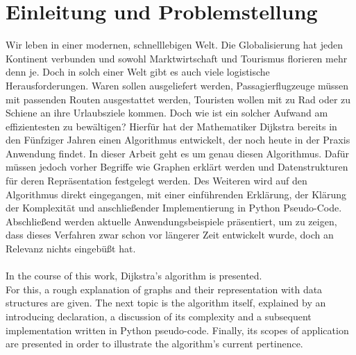 \chapter{Einleitung und Problemstellung}

Wir leben in einer modernen, schnelllebigen Welt. Die Globalisierung hat jeden Kontinent verbunden und sowohl Marktwirtschaft und Tourismus florieren mehr denn je.
Doch in solch einer Welt gibt es auch viele logistische Herausforderungen. Waren sollen ausgeliefert werden, Passagierflugzeuge müssen mit passenden Routen ausgestattet werden, Touristen wollen mit zu Rad oder zu Schiene an ihre Urlaubsziele kommen.
Doch wie ist ein solcher Aufwand am effizientesten zu bewältigen?
Hierfür hat der Mathematiker Dijkstra bereits in den Fünfziger Jahren einen Algorithmus entwickelt, der noch heute in der Praxis Anwendung findet.
In dieser Arbeit geht es um genau diesen Algorithmus.
Dafür müssen jedoch vorher Begriffe wie \glqq Graphen \grqq erklärt werden und Datenstrukturen für deren Repräsentation festgelegt werden.
Des Weiteren wird auf den Algorithmus direkt eingegangen, mit einer einführenden Erklärung, der Klärung der Komplexität und anschließender Implementierung in Python Pseudo-Code.
Abschließend werden aktuelle Anwendungsbeispiele präsentiert, um zu zeigen, dass dieses Verfahren zwar schon vor längerer Zeit entwickelt wurde, doch an Relevanz nichts eingebüßt hat.
\\
\\
In the course of this work, Dijkstra's algorithm is presented. \\
For this, a rough explanation of graphs and their representation with data structures are given. 
The next topic is the algorithm itself, explained by an introducing declaration, a discussion of its complexity and a subsequent implementation written in Python pseudo-code.
Finally, its scopes of application are presented in order to illustrate the algorithm's current pertinence.